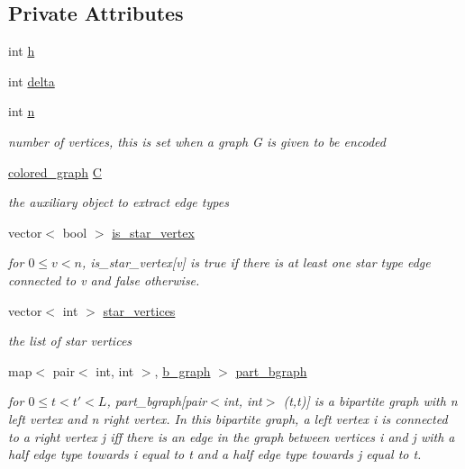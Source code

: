 \subsection*{Private Attributes}
\begin{DoxyCompactItemize}
\item 
int \hyperlink{classmarked__graph__encoder_ae7f8872c57d2d64e4ca6cc47387b9b58}{h}
\item 
int \hyperlink{classmarked__graph__encoder_a29dcf42526b12cf7964a556bb1025c9b}{delta}
\item 
int \hyperlink{classmarked__graph__encoder_a4c66d9fdbc14c97523715aac7e4511cb}{n}
\begin{DoxyCompactList}\small\item\em number of vertices, this is set when a graph G is given to be encoded \end{DoxyCompactList}\item 
\hyperlink{classcolored__graph}{colored\+\_\+graph} \hyperlink{classmarked__graph__encoder_af82bc0653414091291cb75553a407bdb}{C}
\begin{DoxyCompactList}\small\item\em the auxiliary object to extract edge types \end{DoxyCompactList}\item 
vector$<$ bool $>$ \hyperlink{classmarked__graph__encoder_ac36f6c2430af6fa4d20584569859bb59}{is\+\_\+star\+\_\+vertex}
\begin{DoxyCompactList}\small\item\em for $0 \leq v < n$, is\+\_\+star\+\_\+vertex\mbox{[}v\mbox{]} is true if there is at least one star type edge connected to v and false otherwise. \end{DoxyCompactList}\item 
vector$<$ int $>$ \hyperlink{classmarked__graph__encoder_a08fdf6fcd7dcd8c5d1667f2d7ff06c2c}{star\+\_\+vertices}
\begin{DoxyCompactList}\small\item\em the list of star vertices \end{DoxyCompactList}\item 
map$<$ pair$<$ int, int $>$, \hyperlink{classb__graph}{b\+\_\+graph} $>$ \hyperlink{classmarked__graph__encoder_a5faebef707fb681c0b6c2ccf64abc04c}{part\+\_\+bgraph}
\begin{DoxyCompactList}\small\item\em for $0 \leq t < t' < L$, part\+\_\+bgraph\mbox{[}pair$<$int, int$>$ (t,t\textquotesingle{})\mbox{]} is a bipartite graph with n left vertex and n right vertex. In this bipartite graph, a left vertex i is connected to a right vertex j iff there is an edge in the graph between vertices i and j with a half edge type towards i equal to t and a half edge type towards j equal to t\textquotesingle{}. \end{DoxyCompactList}\item 

\end{DoxyCompactItemize}
